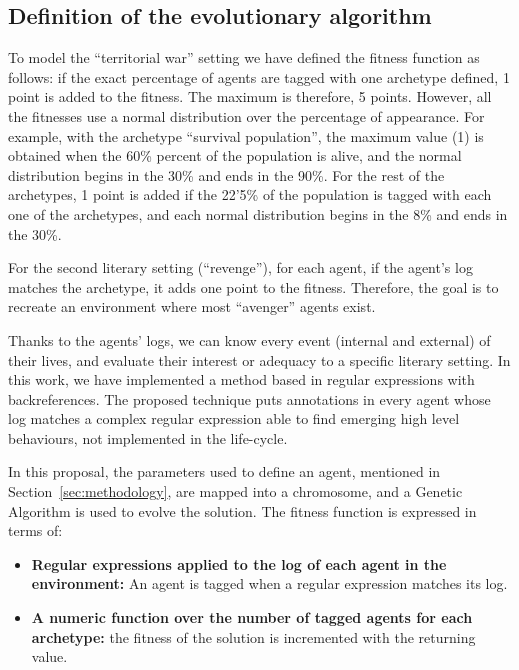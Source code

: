 \documentclass{sig-alternate}
\begin{document}
\subsection{Definition of  the evolutionary algorithm}


To model the ``territorial war'' setting we have defined the fitness function as follows: if the exact percentage of agents are tagged with one archetype defined, 1 point is added to the fitness. The maximum is therefore, 5 points. However, all the fitnesses use a normal distribution over the percentage of appearance. For example, with the archetype ``survival population'', the maximum value (1) is obtained when the 60\% percent of the population is alive, and the normal distribution begins in the 30\% and ends in the 90\%. For the rest of the archetypes, 1 point is added if the 22'5\% of the population is tagged with each one of the archetypes, and each normal distribution begins in the 8\% and ends in the 30\%.

For the second literary setting (``revenge''), for each agent, if the agent's log matches the archetype, it adds one point to the fitness. Therefore, the goal is to recreate an environment where most ``avenger'' agents exist.

Thanks to the agents' logs, we can know every event (internal and
external) of their lives, and evaluate their interest or
adequacy to a specific literary setting.
In this work, we have implemented a method based in regular expressions with backreferences. The proposed technique puts annotations in every agent whose log matches a complex regular expression able to find emerging high level behaviours, not implemented in the life-cycle.

In this proposal, the parameters used to define an agent, mentioned in Section~\ref{sec:methodology}, are mapped into a chromosome, and a Genetic Algorithm is used to evolve the solution. The fitness function is expressed in terms of:

\begin{itemize}
\item \textbf{Regular expressions applied to the log of each agent in the environment:} An agent is tagged when a regular expression matches its log.
\item \textbf{A numeric function over the number of tagged agents for each archetype:} the fitness of the solution is incremented with the returning value.
\end{itemize}
\end{document}
